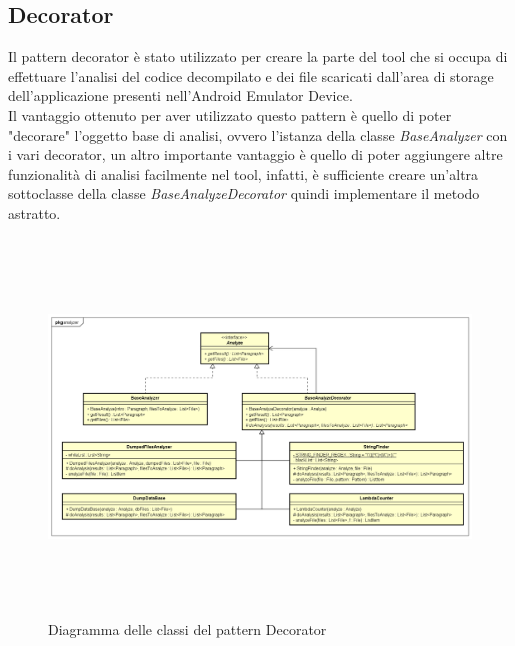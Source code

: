 \subsection{Decorator}\label{subsec:decorator}
Il pattern decorator è stato utilizzato per creare la parte del tool che si occupa di effettuare l'analisi del codice decompilato e dei file scaricati dall'area di storage dell'applicazione presenti nell'Android Emulator Device.\\
Il vantaggio ottenuto per aver utilizzato questo pattern è quello di poter "decorare" l'oggetto base di analisi, ovvero l'istanza della classe \textit{BaseAnalyzer} con i vari decorator, un altro importante vantaggio è quello di poter aggiungere altre funzionalità di analisi facilmente nel tool, infatti, è sufficiente creare un'altra sottoclasse della classe \textit{BaseAnalyzeDecorator} quindi implementare il metodo astratto.
\begin{figure}[H]
    \centering
    \includegraphics[width=13cm, height=10cm]{./immagini/diagrammi_uml/Decorator.png}
    \caption{Diagramma delle classi del pattern Decorator}\label{fig:decorator}
\end{figure}

\newpage
